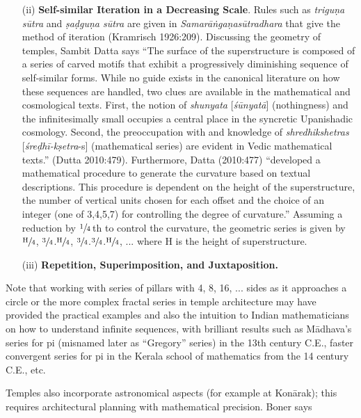 \begin{itemize}
\item[(ii)] \textbf{Self-similar Iteration in a Decreasing Scale}. Rules such as \textsl{triguṇa sūtra} and \textsl{ṣaḍguṇa sūtra} are given in \textsl{Samarāṅgaṇasūtradhara} that give the method of iteration (Kramrisch 1926:209).  Discussing the geometry of temples, Sambit Datta says “The surface of the superstructure is composed of a series of carved motifs that exhibit a progressively diminishing sequence of self-similar forms. While no guide exists in the canonical literature on how these sequences are handled, two clues are available in the mathematical and cosmological texts. First, the notion of \textsl{shunyata} [\textsl{śūnyatā}] (nothingness) and the infinitesimally small occupies a central place in the syncretic Upanishadic cosmology. Second, the preoccupation with and knowledge of \textsl{shredhikshetras} [\textsl{śreḍhī-kṣetra}-s] (mathematical series) are evident in Vedic mathematical texts.” (Dutta 2010:479). Furthermore, Datta (2010:477) “developed a mathematical procedure to generate the curvature based on textual descriptions. This procedure is dependent on the height of the superstructure, the number of vertical units chosen for each offset and the choice of an integer (one of 3,4,5,7) for controlling the degree of curvature.” Assuming a reduction by $\sfrac{1}{4}$\,th to control the curvature, the geometric series is given by $\sfrac{\text{H}}{4}$, $\sfrac{3}{4}$.$\sfrac{\text{H}}{4}$, $\sfrac{3}{4}$.$\sfrac{3}{4}$.$\sfrac{\text{H}}{4}$, ... where H is the height of superstructure.

\item[(iii)] \textbf{Repetition, Superimposition, and Juxtaposition.}
\end{itemize}

Note that working with series of pillars with 4, 8, 16, ... sides as it approaches a circle or the more complex fractal series in temple architecture may have provided the practical examples and also the intuition to Indian mathematicians on how to understand infinite sequences, with brilliant results such as Mādhava’s series for pi (misnamed later as “Gregory” series) in the 13th century C.E., faster convergent series for pi in the Kerala school of mathematics from the 14 century C.E., etc.

Temples also incorporate astronomical aspects (for example at Konārak); this requires architectural planning with mathematical precision. Boner says 

